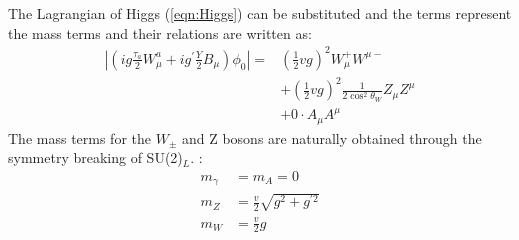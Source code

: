 The Lagrangian of Higgs (\ref{eqn:Higgs}) can be substituted and 
the terms represent the mass terms and their relations are written as:
\begin{equation}
\begin{aligned}
\left|\left(i g \frac{\tau_{a}}{2} W_{\mu}^{a}+i g^{\prime} \frac{Y}{2} B_{\mu}\right) \phi_{0}\right|=&\left(\frac{1}{2} v g\right)^{2} W_{\mu}^{+} W^{\mu-} \\
&+\left(\frac{1}{2} v g\right)^{2} \frac{1}{2 \cos ^{2} \theta_{W}} Z_{\mu} Z^{\mu} \\
&+0 \cdot A_{\mu} A^{\mu}
\end{aligned}
\end{equation}
The mass terms for the $W_\pm$ and Z bosons are naturally obtained through the symmetry breaking of SU(2)$_L$. :
\begin{equation}
\begin{aligned}
m_{\gamma} &=m_{A}=0 \\
m_{Z} &=\frac{v}{2} \sqrt{g^{2}+g^{\prime 2}} \\
m_{W} &=\frac{v}{2} g
\end{aligned}
\end{equation}


